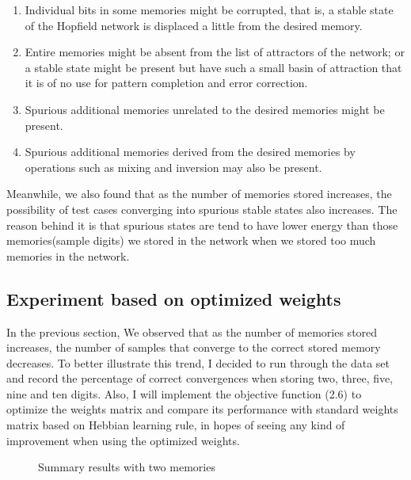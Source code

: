 \begin{enumerate}
  \item Individual bits in some memories might be corrupted, that is, a stable state of the Hopfield network is displaced a little from the desired memory.
  \item Entire memories might be absent from the list of attractors of the network; or a stable state might be present but have such a small basin of attraction that it is of no use for pattern completion and error correction.
  \item Spurious additional memories unrelated to the desired memories might be present.
  \item Spurious additional memories derived from the desired memories by operations such as mixing and inversion may also be present.
\end{enumerate}

Meanwhile, we also found that as the number of memories stored increases, the possibility of test cases converging into spurious stable states also increases. The reason behind it is that spurious states are tend to have lower energy than those memories(sample digits) we stored in the network when we stored too much memories in the network.\\ 

\subsection{Experiment based on optimized weights}
In the previous section, We observed that as the number of memories stored increases, the number of samples that converge to the correct stored memory decreases. To better illustrate this trend, I decided to run through the data set and record the percentage of correct convergences when storing two, three, five, nine and ten digits. Also, I will implement the objective function (2.6) to optimize the weights matrix and compare its performance with standard weights matrix based on Hebbian learning rule, in hopes of seeing any kind of improvement when using the optimized weights.\\

\begin{figure}[h]
	\centering
	\caption{Summary results with two memories}
	\label{fg:ost1}
\end{figure}

